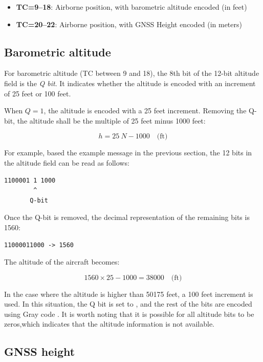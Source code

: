\begin{itemize}
\item \textbf{TC=9--18}: Airborne position, with barometric altitude encoded (in feet)
\item \textbf{TC=20--22}: Airborne position, with GNSS Height encoded (in meters)
\end{itemize}

\subsection{Barometric altitude}
For barometric altitude (TC between 9 and 18), the 8th bit of the 12-bit altitude field is the \emph{Q bit}. It indicates whether the altitude is encoded with an increment of 25 feet or 100 feet.

When $Q=1$, the altitude is encoded with a 25 feet increment. Removing the Q-bit, the altitude shall be the multiple of 25 feet minus 1000 feet:

\begin{equation}
  h = 25 ~ N - 1000 \quad \text{(ft)}
\end{equation}

For example, based the example message in the previous section, the 12 bits in the altitude field can be read as follows:

\begin{verbatim}
1100001 1 1000
        ^
       Q-bit
\end{verbatim}

Once the Q-bit is removed, the decimal representation of the remaining bits is 1560:

\begin{verbatim}
11000011000 -> 1560
\end{verbatim}

The altitude of the aircraft becomes:

\begin{equation}
1560 \times 25 - 1000 = 38000 \quad \text{(ft)}
\end{equation}

In the case where the altitude is higher than 50175 feet, a 100 feet increment is used. In this situation, the Q bit is set to \0, and the rest of the bits are encoded using Gray code \cite{doran2007}. It is worth noting that it is possible for all altitude bits to be zeros,which indicates that the altitude information is not available.


\subsection{GNSS height}

